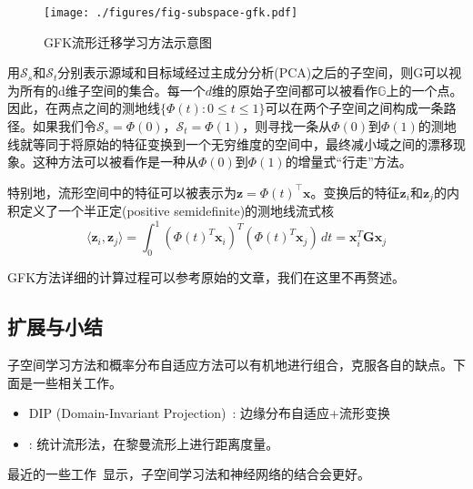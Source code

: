 \begin{figure}[htbp]
	\centering
	\texttt{[image: ./figures/fig-subspace-gfk.pdf]}
	\caption{GFK流形迁移学习方法示意图}
	\label{fig-subspace-gfk}
\end{figure}

用$\mathcal{S}_s$和$\mathcal{S}_t$分别表示源域和目标域经过主成分分析(PCA)之后的子空间，则G可以视为所有的d维子空间的集合。每一个$d$维的原始子空间都可以被看作$\mathbb{G}$上的一个点。因此，在两点之间的测地线$\{\Phi(t):0 \leq t \leq 1\}$可以在两个子空间之间构成一条路径。如果我们令$\mathcal{S}_s=\Phi(0)$，$\mathcal{S}_t=\Phi(1)$，则寻找一条从$\Phi\left(0\right)$到$\Phi\left(1\right)$的测地线就等同于将原始的特征变换到一个无穷维度的空间中，最终减小域之间的漂移现象。这种方法可以被看作是一种从$\Phi\left(0\right)$到$\Phi\left(1\right)$的增量式“行走”方法。

特别地，流形空间中的特征可以被表示为$\mathbf{z}=\Phi\left(t\right)^\top \mathbf{x}$。变换后的特征$\mathbf{z}_i$和$\mathbf{z}_j$的内积定义了一个半正定(positive semidefinite)的测地线流式核
\begin{equation}
	\langle\mathbf{z}_i,\mathbf{z}_j\rangle= \int_{0}^{1} (\Phi(t)^T \mathbf{x}_i)^T (\Phi(t)^T \mathbf{x}_j) \, dt = \mathbf{x}^T_i \mathbf{G} \mathbf{x}_j
\end{equation}

GFK方法详细的计算过程可以参考原始的文章，我们在这里不再赘述。

\subsection{扩展与小结}

子空间学习方法和概率分布自适应方法可以有机地进行组合，克服各自的缺点。下面是一些相关工作。

\begin{itemize}
	\item DIP (Domain-Invariant Projection)~\cite{baktashmotlagh2013unsupervised}: 边缘分布自适应+流形变换
	\item \cite{baktashmotlagh2014domain}: 统计流形法，在黎曼流形上进行距离度量。
\end{itemize}

最近的一些工作~\cite{sun2016deep}显示，子空间学习法和神经网络的结合会更好。

